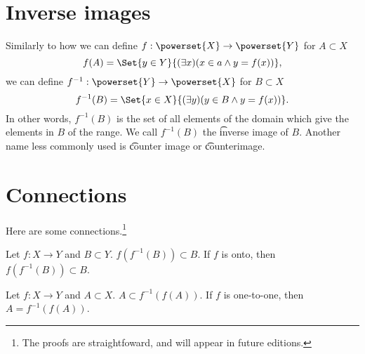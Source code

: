 \section*{Inverse images}

Similarly to how we can define $f: \powerset{X} \to \powerset{Y}$ for $A \subset X$
\[
f(A) = \Set{y \in Y}{(\exists x)(x \in a \land y = f(x))},
\]
we can define $f^{-1}: \powerset{Y} \to \powerset{X}$ for $B \subset X$
\[
f^{-1}(B) = \Set{x \in X}{(\exists y)(y \in B \land y = f(x))}.
\]
In other words, $f^{-1}(B)$ is the set of all elements of the domain which give the elements in $B$ of the range.
We call $f^{-1}(B)$ the \t{inverse image} of $B$.
Another name less commonly used is \t{counter image} or \t{counterimage}.

\section*{Connections}

Here are some connections.\footnote{The proofs are straightfoward, and will appear in future editions.}
\begin{proposition}
Let $f: X \to Y$ and $B \subset Y$.
$f(f^{-1}(B)) \subset B$. If $f$ is onto, then $f(f^{-1}(B)) \subset B$.
\end{proposition}

\begin{proposition}
Let $f: X \to Y$ and $A \subset X$.
$A \subset f^{-1}(f(A))$.
If $f$ is one-to-one, then $A = f^{-1}(f(A))$.
\end{proposition}
